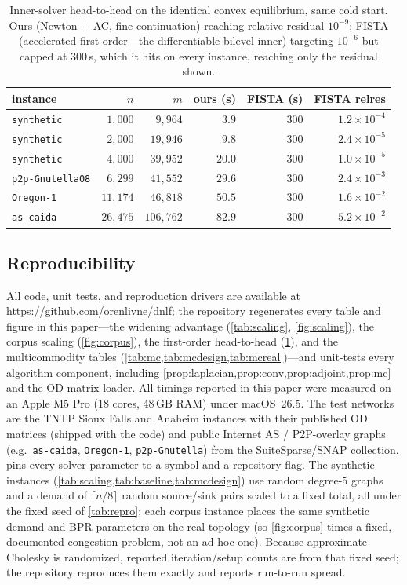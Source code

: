 \documentclass[ijoc]{informs3}
\begin{document}
\begin{table}[t]\centering
\caption{Inner-solver head-to-head on the identical convex equilibrium, same cold start. Ours (Newton $+$
AC, fine continuation) reaching relative residual $10^{-9}$; FISTA (accelerated
first-order---the differentiable-bilevel inner) targeting $10^{-6}$ but capped at $300$\,s, which it hits on
every instance, reaching only the residual shown.}
\label{tab:baseline}
\begin{tabular}{lrrrrr}\toprule
instance & $n$ & $m$ & ours (s) & FISTA (s) & FISTA relres\\\midrule
\texttt{synthetic}      & $1{,}000$  & $9{,}964$   & $3.9$  & $300$ & $1.2\times10^{-4}$\\
\texttt{synthetic}      & $2{,}000$  & $19{,}946$  & $9.8$ & $300$ & $2.4\times10^{-5}$\\
\texttt{synthetic}      & $4{,}000$  & $39{,}952$  & $20.0$ & $300$ & $1.0\times10^{-5}$\\
\texttt{p2p-Gnutella08} & $6{,}299$  & $41{,}552$  & $29.6$ & $300$ & $2.4\times10^{-3}$\\
\texttt{Oregon-1}       & $11{,}174$ & $46{,}818$  & $50.5$ & $300$ & $1.6\times10^{-2}$\\
\texttt{as-caida}       & $26{,}475$ & $106{,}762$ & $82.9$ & $300$ & $5.2\times10^{-2}$\\
\end{tabular}
\end{table}

\subsection{Reproducibility}
All code, unit tests, and reproduction drivers are available at \url{https://github.com/orenlivne/dnlf}; the
repository regenerates every table and figure in this paper---the widening advantage (\cref{tab:scaling},
\cref{fig:scaling}), the corpus scaling (\cref{fig:corpus}), the first-order head-to-head
(\cref{tab:baseline}), and the multicommodity tables (\cref{tab:mc,tab:mcdesign,tab:mcreal})---and unit-tests
every algorithm component, including \cref{prop:laplacian,prop:conv,prop:adjoint,prop:mc} and the OD-matrix
loader. All timings reported in this paper were measured on an Apple M5 Pro (18 cores, 48\,GB RAM) under
macOS~26.5. The test networks are the TNTP Sioux Falls and Anaheim instances with their published
OD matrices (shipped with the code) and public Internet AS / P2P-overlay graphs (e.g.\ \texttt{as-caida},
\texttt{Oregon-1}, \texttt{p2p-Gnutella}) from the SuiteSparse/SNAP collection.
 pins every solver parameter to a symbol and a repository flag. The synthetic instances (\cref{tab:scaling,tab:baseline,tab:mcdesign})
use random degree-$5$ graphs and a demand of $\lceil n/8\rceil$ random source/sink pairs scaled to a fixed
total, all under the fixed seed of \cref{tab:repro}; each corpus instance places the same synthetic demand and
BPR parameters on the real topology (so \cref{fig:corpus} times a fixed, documented congestion problem, not an
ad-hoc one). Because approximate Cholesky is randomized, reported iteration/setup counts are from that fixed
seed; the repository reproduces them exactly and reports run-to-run spread.
\end{document}
